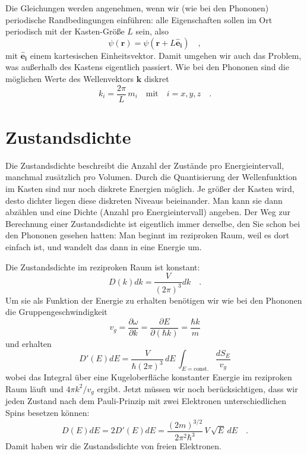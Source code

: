 Die Gleichungen werden angenehmen, wenn wir (wie bei den Phononen) periodische Randbedingungen einführen: alle Eigenschaften sollen im Ort periodisch mit der Kasten-Größe $L$ sein, also 
\begin{equation}
    \psi(\mathbf{r}) =  \psi(\mathbf{r} + L \mathbf{\hat{e}_i}) \quad ,
\end{equation}
mit $\mathbf{\hat{e}_i}$ einem kartesischen Einheitsvektor. Damit umgehen wir auch das Problem, was außerhalb des Kastens eigentlich passiert.
Wie bei den Phononen sind die möglichen Werte des Wellenvektors  $\mathbf{k}$ diskret
\begin{equation}
    k_i = \frac{2 \pi}{L} \, m_i \quad \text{mit} \quad i = x,y,z \quad . \label{eq:2:k_randbed} 
\end{equation}




\section*{Zustandsdichte}

Die Zustandsdichte beschreibt die Anzahl der Zustände pro Energieintervall, manchmal zusätzlich pro Volumen. Durch die Quantisierung der Wellenfunktion im Kasten sind nur noch diskrete Energien möglich. Je größer der Kasten wird, desto dichter liegen diese diskreten Niveaus beieinander. Man kann sie dann abzählen und eine Dichte (Anzahl pro Energieintervall) angeben. Der Weg zur Berechnung einer Zustandsdichte ist eigentlich immer derselbe, den Sie schon bei den Phononen gesehen hatten: Man beginnt im reziproken Raum, weil es dort einfach ist, und wandelt das dann in eine Energie um.

Die Zustandsdichte im reziproken Raum ist konstant:
\begin{equation}
    D(k) dk = \frac{V}{(2 \pi)^3} dk \quad .
\end{equation}
Um sie als Funktion der Energie zu erhalten benötigen wir wie bei den Phononen die Gruppengeschwindigkeit 
\begin{equation}
    v_g = \frac{\partial \omega}{ \partial k} = \frac{\partial E}{\partial (\hbar k)} = \frac{\hbar k}{m}
\end{equation}
und erhalten 
\begin{equation}
    D'(E) dE = \frac{V}{\hbar (2 \pi)^3} \, dE \, \int_{E = \text{const.}} \frac{d S_E}{v_g}  
\end{equation}
wobei das Integral über eine Kugeloberfläche konstanter Energie im reziproken Raum läuft und $4 \pi k^2 / v_g$ ergibt.
Jetzt müssen wir noch berücksichtigen, dass wir jeden Zustand nach dem Pauli-Prinzip mit zwei Elektronen unterschiedlichen Spins besetzen können:
\begin{equation}
    D(E) dE = 2 D'(E) dE =  \frac{(2m)^{3/2}}{2 \pi^2 \hbar^3} \, V \,  \sqrt{E} \, dE \quad .
\end{equation}
Damit haben wir die Zustandsdichte von freien Elektronen.

